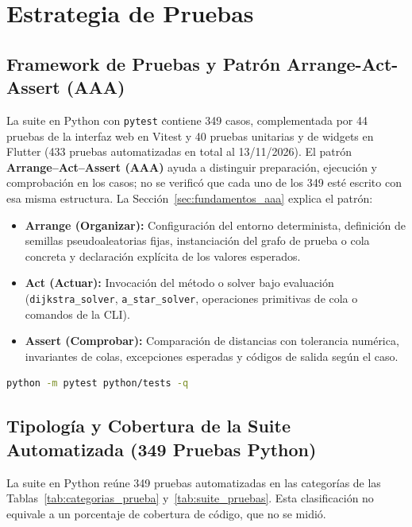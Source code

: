 \section{Estrategia de Pruebas}
\label{sec:pruebas}

\subsection{Framework de Pruebas y Patrón Arrange-Act-Assert (AAA)}
La suite en Python con \texttt{pytest} contiene 349 casos, complementada por 44 pruebas de la interfaz web en Vitest y 40 pruebas unitarias y de widgets en Flutter (433 pruebas automatizadas en total al 13/11/2026). El patrón \textbf{Arrange--Act--Assert (AAA)} ayuda a distinguir preparación, ejecución y comprobación en los casos; no se verificó que cada uno de los 349 esté escrito con esa misma estructura. La Sección~\ref{sec:fundamentos_aaa} explica el patrón:
\begin{itemize}
    \item \textbf{Arrange (Organizar):} Configuración del entorno determinista, definición de semillas pseudoaleatorias fijas, instanciación del grafo de prueba o cola concreta y declaración explícita de los valores esperados.
    \item \textbf{Act (Actuar):} Invocación del método o solver bajo evaluación (\texttt{dijkstra\_solver}, \texttt{a\_star\_solver}, operaciones primitivas de cola o comandos de la CLI).
    \item \textbf{Assert (Comprobar):} Comparación de distancias con tolerancia numérica, invariantes de colas, excepciones esperadas y códigos de salida según el caso.
\end{itemize}

\begin{lstlisting}[language=bash, caption={Comando de ejecución de la suite automatizada completa}]
python -m pytest python/tests -q
\end{lstlisting}

\subsection{Tipología y Cobertura de la Suite Automatizada (349 Pruebas Python)}
La suite en Python reúne 349 pruebas automatizadas en las categorías de las Tablas~\ref{tab:categorias_prueba} y~\ref{tab:suite_pruebas}. Esta clasificación no equivale a un porcentaje de cobertura de código, que no se midió.

